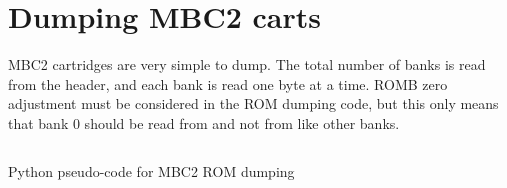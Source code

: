 \section{Dumping MBC2 carts}

MBC2 cartridges are very simple to dump. The total number of banks is read from
the header, and each bank is read one byte at a time. ROMB zero adjustment must
be considered in the ROM dumping code, but this only means that bank 0 should
be read from  and not from  like
other banks.

\begin{listing}[H]
  \inputminted[frame=lines]{python}{code-snippets/mbc2_rom_dump.py}
  \caption{Python pseudo-code for MBC2 ROM dumping}
\end{listing}

